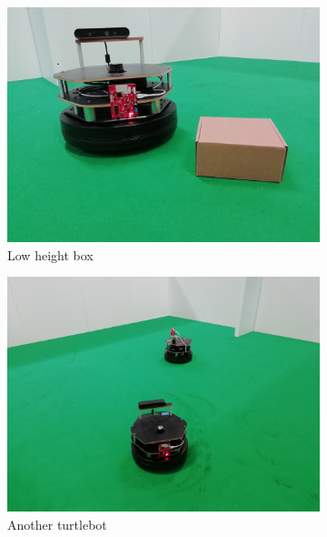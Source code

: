 \begin{figure}[h!]
\begin{subfigure}[b]{0.3\linewidth}
    \includegraphics[width=\linewidth]{imgs/chapter5/box.jpg}
    \caption{Low height box}
    \label{fig::box}
  \end{subfigure}
  \begin{subfigure}[b]{0.3\linewidth}
    \includegraphics[width=\linewidth]{imgs/chapter5/robot.jpg}
    \caption{Another turtlebot}
    \label{fig::robot}
  \end{subfigure}
  \begin{subfigure}[b]{0.3\linewidth}

\end{subfigure}
\end{figure}
